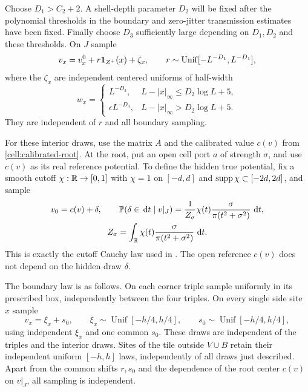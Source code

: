 Choose $D_1>C_2+2$.  A shell-depth parameter $D_2$ will be fixed after
the polynomial thresholds in the boundary and zero-jitter transmission
estimates have been fixed.  Finally choose $D_3$ sufficiently large
depending on $D_1,D_2$ and these thresholds.  On $J$ sample
\begin{equation}
 v_x=v_x^0+r\mathbf 1_{Z^+}(x)+\zeta_x,
 \qquad r\sim\operatorname{Unif}[-L^{-D_1},L^{-D_1}],
 \label{cell:interior-sampler}
\end{equation}
where the $\zeta_x$ are independent centered uniforms of half-width
\begin{equation}
 w_x=
 \begin{cases}
 L^{-D_3},& L-|x|_\infty\le D_2\log L+5,\\
 \epsilon L^{-D_3},& L-|x|_\infty>D_2\log L+5.
 \end{cases}
 \label{cell:jitter-widths}
\end{equation}
They are independent of $r$ and all boundary sampling.

For these interior draws, use the matrix $A$ and the calibrated value
$c(v)$ from \cref{cell:calibrated-root}. At the root, put an open cell
port $a$ of strength $\sigma$, and use $c(v)$ as its real reference
potential. To define the hidden true potential, fix a smooth cutoff $\chi:\mathbb R\to[0,1]$ with $\chi=1$ on
$[-d,d]$ and $\operatorname{supp}\chi\subset[-2d,2d]$, and sample
\begin{equation}
 \begin{gathered}
 v_0=c(v)+\delta,\qquad
 \mathbb P(\delta\in\,\mathrm d t\mid v|_J)
   =\frac{1}{Z_\sigma}\chi(t)\frac{\sigma}{\pi(t^2+\sigma^2)}\,\,\mathrm d t,\\
 Z_\sigma=\int_{\mathbb R}\chi(t)\frac{\sigma}{\pi(t^2+\sigma^2)}\,\,\mathrm d t.
 \end{gathered}
 \label{cell:hidden-root}
\end{equation}
This is exactly the cutoff Cauchy law used in .
The open reference $c(v)$ does not depend on the hidden draw $\delta$.

The boundary law is as follows.  On each corner triple sample uniformly
in its prescribed box, independently between the four triples.  On
every single side site $x$ sample
\begin{equation}
 v_x=\xi_x+s_0,\qquad
 \xi_x\sim\operatorname{Unif}[-h/4,h/4],\qquad
 s_0\sim\operatorname{Unif}[-h/4,h/4],
 \label{cell:side-law}
\end{equation}
using independent $\xi_x$ and one common $s_0$.  These draws are
independent of the triples and the interior draws.  Sites of the tile
outside $V\cup B$ retain their independent uniform $[-h,h]$ laws,
independently of all draws just described.  Apart from the common shifts
$r,s_0$ and the dependence of the root center $c(v)$ on $v|_J$, all
sampling is independent.

